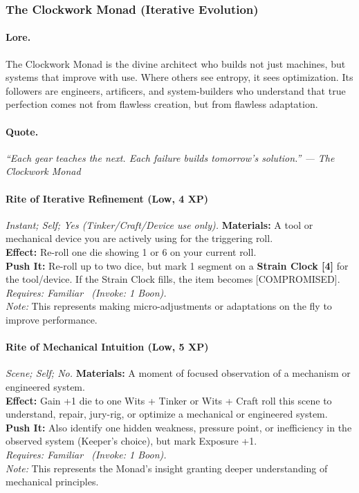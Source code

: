 
\subsubsection{The Clockwork Monad (Iterative Evolution)}

\paragraph{Lore.}
The Clockwork Monad is the divine architect who builds not just machines, but systems that improve with use. Where others see entropy, it sees optimization. Its followers are engineers, artificers, and system-builders who understand that true perfection comes not from flawless creation, but from flawless adaptation.

\paragraph{Quote.}
\emph{``Each gear teaches the next. Each failure builds tomorrow's solution.'' — The Clockwork Monad}


\paragraph{Rite of Iterative Refinement (Low, 4 XP)} \emph{Instant; Self; Yes (Tinker/Craft/Device use only).}
\textbf{Materials:} A tool or mechanical device you are actively using for the triggering roll. \\
\textbf{Effect:} Re-roll one die showing 1 or 6 on your current roll. \\
\textbf{Push It:} Re-roll up to two dice, but mark 1 segment on a \textbf{Strain Clock [4]} for the tool/device. If the Strain Clock fills, the item becomes [COMPROMISED]. \\
\emph{Requires: Familiar \ (\textit{Invoke:} 1 Boon).} \\
\emph{Note:} This represents making micro-adjustments or adaptations on the fly to improve performance.

\paragraph{Rite of Mechanical Intuition (Low, 5 XP)} \emph{Scene; Self; No.}
\textbf{Materials:} A moment of focused observation of a mechanism or engineered system. \\
\textbf{Effect:} Gain +1 die to one Wits + Tinker or Wits + Craft roll this scene to understand, repair, jury-rig, or optimize a mechanical or engineered system. \\
\textbf{Push It:} Also identify one hidden weakness, pressure point, or inefficiency in the observed system (Keeper's choice), but mark Exposure +1. \\
\emph{Requires: Familiar \ (\textit{Invoke:} 1 Boon).} \\
\emph{Note:} This represents the Monad's insight granting deeper understanding of mechanical principles.

